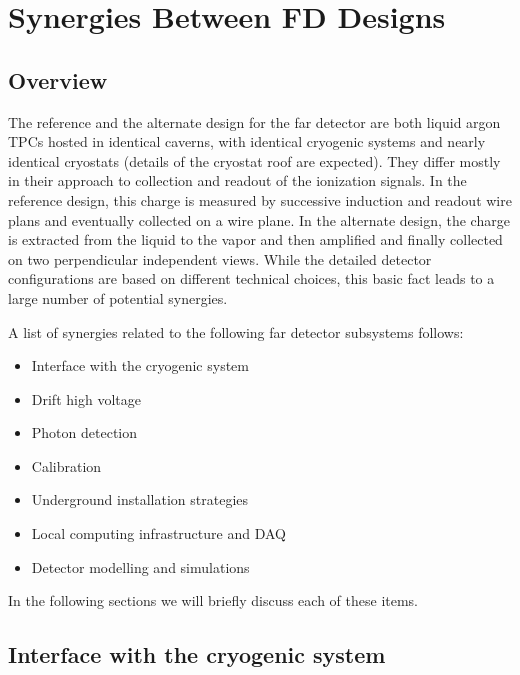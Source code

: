 \chapter{Synergies Between FD Designs}
\label{ch:detectors-synergy}

\section{Overview}

The reference and the alternate design for the far detector are both
liquid argon TPCs hosted in identical caverns, with identical
cryogenic systems and nearly identical cryostats (details of the
cryostat roof are expected). They differ mostly in their
approach to collection and readout of the ionization signals. In the
reference design, this charge is measured by successive induction and
readout wire plans and eventually collected on a wire plane. In the
alternate design, the charge is extracted from the liquid to the
vapor and then amplified and finally collected on two perpendicular
independent views. While the detailed detector configurations are
based on different technical choices, this basic fact leads to a large
number of potential synergies.

A list of synergies related to the following far detector subsystems
follows:
\begin{itemize}
\item Interface with the cryogenic system
\item Drift high voltage 
\item Photon detection
\item Calibration
\item Underground installation strategies
\item Local computing infrastructure and DAQ
\item Detector modelling and simulations
\end{itemize}

In the following sections we will briefly discuss each of these items. 
  


\section{Interface with the cryogenic system}

